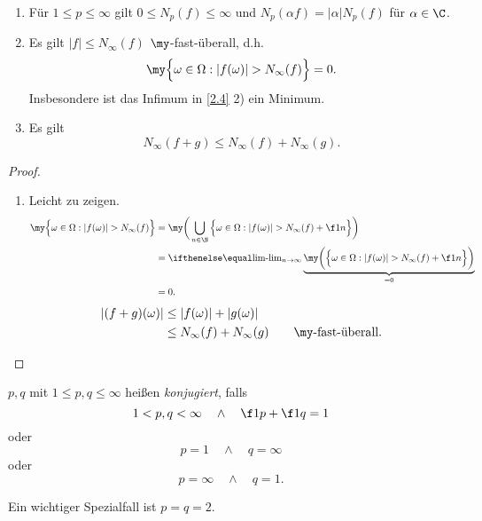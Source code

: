 \begin{st}[Eigenschaften] \label{2.5}
	\begin{enumerate}[1)]
		\item
			Für $1 \le p \le \infty$ gilt $0 \le N_p(f) \le \infty$ und $N_p(\alpha f) = |\alpha| N_p(f)$ für $\alpha \in \C$.
		\item
			Es gilt $|f| \le N_\infty(f)$ $\my$-fast-überall, d.h.
			\[
				\my \Big\{ \omega \in \Omega : |f(\omega)| > N_\infty(f) \Big\} = 0.
			\]
			Insbesondere ist das Infimum in \ref{2.4} 2) ein Minimum.
		\item
			Es gilt
			\[
				N_\infty(f+g) \le N_\infty (f) + N_\infty(g).
			\]
	\end{enumerate}
	\begin{proof}
		\begin{enumerate}[1)]
			\item Leicht zu zeigen.
			\itemdm
				\begin{align*}
					\my \Big\{ \omega \in \Omega : |f(\omega)| > N_\infty(f) \Big\}
					&= \my \bigg( \bigcup_{n\in \N} \Big\{ \omega \in \Omega : |f(\omega)| > N_\infty(f) + \f 1n \Big\} \bigg) \\
					&= \lim_{n\to \infty }\underbrace{\my \bigg( \Big\{ \omega \in \Omega : |f(\omega)| > N_\infty(f) + \f 1n \Big\} \bigg)}_{=0} \\
					&=  0.
				\end{align*}
			\itemdm
				\begin{align*}
					|(f+g)(\omega)|
					& \le |f(\omega)| + |g(\omega)| \\
					& \le N_\infty(f) + N_\infty(g) \qquad \text{$\my$-fast-überall.}
				\end{align*}
		\end{enumerate}
	\end{proof}
\end{st}

\begin{df} \label{2.6}
	$p,q$ mit $1 \le p,q \le \infty$ heißen \emph{konjugiert}, falls
	\[
		1 < p, q < \infty \quad\land\quad \f 1p + \f 1q = 1
	\]
	oder
	\[
		p = 1 \quad\land\quad q = \infty
	\]
	oder
	\[
		p = \infty \quad\land\quad q = 1.
	\]
	\begin{note}
		Ein wichtiger Spezialfall ist $p=q=2$.
	\end{note}
\end{df}



